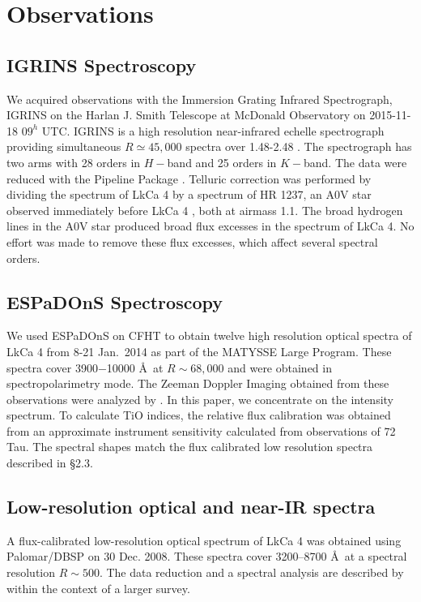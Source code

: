 \documentclass[twocolumn]{emulateapj}%
\newcommand{\name}{LkCa 4 }
\begin{document}
\section{Observations}\label{sec:obs} 

\subsection{IGRINS Spectroscopy}\label{sec:igrins} 
We acquired observations with the Immersion Grating Infrared Spectrograph, IGRINS \citep{park14} on the Harlan J. Smith Telescope at McDonald Observatory on 2015-11-18 $09^h$ UTC.  IGRINS is a high resolution near-infrared echelle spectrograph providing simultaneous $R\simeq45,000$ spectra over 1.48-2.48 \um.  The spectrograph has two arms with 28 orders in $H-$band and 25 orders in $K-$band.  The data were reduced with the Pipeline Package \citep{jaejoonlee15}.  Telluric correction was performed by dividing the spectrum of \name by a spectrum of HR 1237, an A0V star observed immediately before \name, both at airmass 1.1.  The broad hydrogen lines in the A0V star produced broad flux excesses in the spectrum of LkCa 4.  No effort was made to remove these flux excesses, which affect several spectral orders. 


\subsection{ESPaDOnS Spectroscopy}
We used ESPaDOnS on CFHT to obtain twelve high resolution optical spectra of \name from 8-21 Jan.~2014 as part of the MATYSSE Large Program.  These spectra cover 3900$-$10000 \AA\ at $R\sim68,000$ and were obtained in spectropolarimetry mode.  The Zeeman Doppler Imaging obtained from these observations were analyzed by \citet{donati14}.  In this paper, we concentrate on the intensity spectrum.  To calculate TiO indices, the relative flux calibration was obtained from an approximate instrument sensitivity calculated from observations of 72 Tau.  The spectral shapes match the flux calibrated low resolution spectra described in \S 2.3.


\subsection{Low-resolution optical and near-IR spectra}

A flux-calibrated low-resolution optical spectrum of LkCa 4 was obtained using Palomar/DBSP \citep{Oke1982} on 30 Dec. 2008.  These spectra cover 3200--8700 \AA\ at a spectral resolution $R\sim 500$.  The data reduction and a spectral analysis are described by \citet{herczeg14} within the context of a larger survey.
\end{document}
